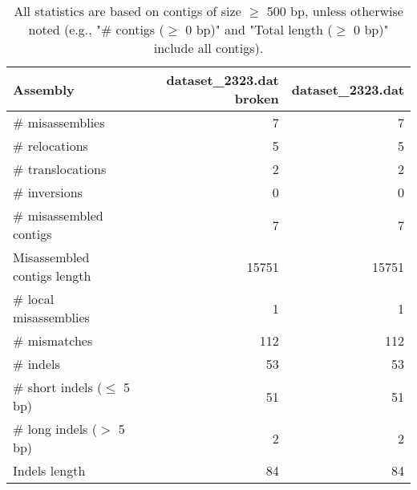\documentclass[12pt,a4paper]{article}
\begin{document}
\begin{table}[ht]
\begin{center}
\caption{All statistics are based on contigs of size $\geq$ 500 bp, unless otherwise noted (e.g., "\# contigs ($\geq$ 0 bp)" and "Total length ($\geq$ 0 bp)" include all contigs).}
\begin{tabular}{|l*{2}{|r}|}
\hline
Assembly & dataset\_2323.dat broken & dataset\_2323.dat \\ \hline
\# misassemblies & 7 & 7 \\ \hline
\hspace{5mm}\# relocations & 5 & 5 \\ \hline
\hspace{5mm}\# translocations & 2 & 2 \\ \hline
\hspace{5mm}\# inversions & 0 & 0 \\ \hline
\# misassembled contigs & 7 & 7 \\ \hline
Misassembled contigs length & 15751 & 15751 \\ \hline
\# local misassemblies & 1 & 1 \\ \hline
\# mismatches & 112 & 112 \\ \hline
\# indels & 53 & 53 \\ \hline
\hspace{5mm}\# short indels ($\leq$ 5 bp) & 51 & 51 \\ \hline
\hspace{5mm}\# long indels ($>$ 5 bp) & 2 & 2 \\ \hline
Indels length & 84 & 84 \\ \hline
\end{tabular}
\end{center}
\end{table}
\end{document}
